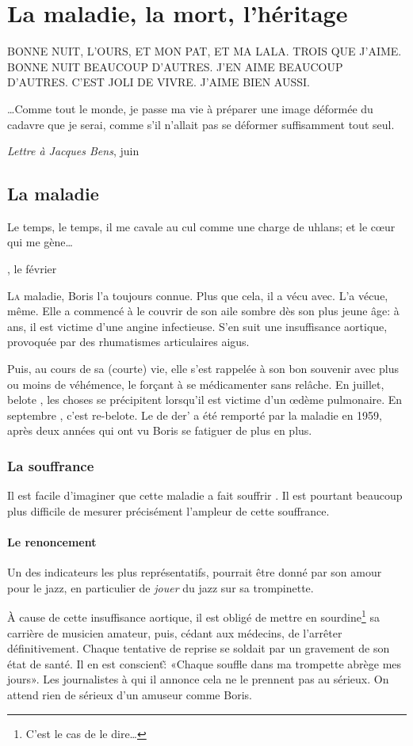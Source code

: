 \chapter{La maladie, la mort, l'héritage}
\epigraph{BONNE NUIT, L'OURS, ET MON PAT, ET MA LALA. TROIS QUE J'AIME. BONNE NUIT BEAUCOUP D'AUTRES. J'EN AIME BEAUCOUP D'AUTRES. C'EST JOLI DE VIVRE. J'AIME BIEN AUSSI.}
{\BV}
\epigraph{\ldots Comme tout le monde, je passe ma vie à préparer une image déformée du cadavre
que je serai, comme s'il n'allait pas se déformer suffisamment tout seul.}
{\emph{Lettre à Jacques Bens},  juin }
\vfill
\pagebreak
\section{La maladie}
\epigraph{Le temps, le temps, il me cavale au cul comme une charge de uhlans; et le c\oe{}ur qui me gène\ldots}
{\BV, le  février }

\lettrine{L}a maladie, Boris l'a toujours connue. Plus que cela, il a vécu avec. L'a vécue, même.
Elle a commencé à le couvrir de son aile sombre dès son plus jeune âge: à  ans, il
est victime d'une angine infectieuse. S'en suit une insuffisance aortique, provoquée 
par des rhumatismes articulaires aigus.

Puis, au cours de sa (courte) vie, elle s'est rappelée à son bon souvenir
avec plus ou moins de véhémence, le forçant à se médicamenter sans relâche. En juillet, belote ,
les choses se précipitent lorsqu'il est victime d'un \oe{}dème pulmonaire.
En septembre , c'est re-belote. Le  de der' a été remporté par la maladie
en 1959, après deux années qui ont vu Boris se fatiguer de plus en plus.

\subsection{La souffrance}
Il est facile d'imaginer que cette maladie a fait souffrir \BV. Il est
pourtant beaucoup plus difficile de mesurer précisément l'ampleur de
cette souffrance.

\subsubsection{Le renoncement}
Un des indicateurs les plus représentatifs, pourrait être donné par son amour
pour le jazz, en particulier de \emph{jouer} du jazz sur sa trompinette.

À cause de cette insuffisance aortique, il est obligé de mettre en sourdine\footnote{C'est le cas
de le dire\ldots} sa carrière de musicien amateur, puis, cédant aux médecins, de l'arrêter
définitivement. Chaque tentative de reprise se soldait par un gravement de son état de santé.
Il en est conscient\~: «Chaque souffle dans ma trompette abrège mes jours». Les journalistes à
qui il annonce cela ne le prennent pas au sérieux. On attend rien de sérieux d'un
amuseur comme Boris.

